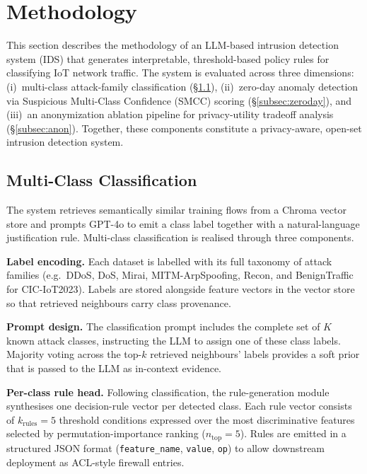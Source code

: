 
\section{Methodology}
\label{sec:methodology}

This section describes the methodology of an LLM-based intrusion detection
system (IDS) that generates interpretable, threshold-based policy rules for
classifying IoT network traffic. The system is evaluated across three
dimensions: (i)~multi-class attack-family classification
(\S\ref{subsec:multiclass}), (ii)~zero-day anomaly detection via Suspicious
Multi-Class Confidence (SMCC) scoring (\S\ref{subsec:zeroday}), and
(iii)~an anonymization ablation pipeline for privacy-utility tradeoff analysis
(\S\ref{subsec:anon}). Together, these components constitute a privacy-aware,
open-set intrusion detection system.

\subsection{Multi-Class Classification}
\label{subsec:multiclass}

The system retrieves semantically similar training flows from a Chroma vector
store and prompts GPT-4o to emit a class label together with a natural-language
justification rule. Multi-class classification is realised through three
components.

\textbf{Label encoding.} Each dataset is labelled with its full taxonomy of
attack families (e.g.\ DDoS, DoS, Mirai, MITM-ArpSpoofing, Recon, and
BenignTraffic for CIC-IoT2023). Labels are stored alongside feature vectors in
the vector store so that retrieved neighbours carry class provenance.

\textbf{Prompt design.} The classification prompt includes the complete set of
$K$ known attack classes, instructing the LLM to assign one of these class
labels. Majority voting across the top-$k$ retrieved neighbours' labels
provides a soft prior that is passed to the LLM as in-context evidence.

\textbf{Per-class rule head.} Following classification, the rule-generation
module synthesises one decision-rule vector per detected class. Each rule vector
consists of $k_{\text{rules}} = 5$ threshold conditions expressed over the
most discriminative features selected by permutation-importance ranking
($n_{\text{top}} = 5$). Rules are emitted in a structured JSON format
(\texttt{feature\_name}, \texttt{value}, \texttt{op}) to allow downstream
deployment as ACL-style firewall entries.

